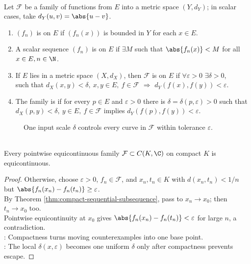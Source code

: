 \begin{definition} \label{def:pointwise-uniform-bounded-equicontinuous} \\
Let $\mathcal{F}$ be a family of functions from $E$ into a metric space $(Y,d_Y)$; in scalar cases, take $d_Y(u,v)=\abs{u-v}$.
\begin{enumerate}[label=(\roman*)]
\setlength{\itemsep}{0pt}
\item $(f_n)$ is  on $E$ if $(f_n(x))$ is bounded in $Y$ for each $x\in E$.
\item A scalar sequence $(f_n)$ is  on $E$ if $\exists M$ such that $\abs{f_n(x)}<M$ for all $x\in E,n\in\N$.
\item If $E$ lies in a metric space $(X,d_X)$, then $\mathcal{F}$ is  on $E$ if $\forall\varepsilon>0$ $\exists\delta>0$,\\
such that $d_X(x,y)<\delta,\ x,y\in E,\ f\in\mathcal{F}$ $\Longrightarrow$ $d_Y(f(x),f(y))<\varepsilon$.
\item The family is  if for every $p\in E$ and $\varepsilon>0$ there is $\delta=\delta(p,\varepsilon)>0$ such that $d_X(p,y)<\delta,\ y\in E,\ f\in\mathcal{F}$ implies $d_Y(f(p),f(y))<\varepsilon$.
\end{enumerate}
\end{definition}

\begin{figure}[H]
  \centering
  
  \caption{One input scale $\delta$ controls every curve in $\mathcal F$ within tolerance $\varepsilon$.}
  \label{fig:equicontinuity-family-schematic}
\end{figure}

\begin{theorem} \label{thm:pointwise-equicontinuity-compact-uniform} \\
Every pointwise equicontinuous family $\mathcal{F}\subset C(K,\C)$ on compact $K$ is equicontinuous.
\begin{proof}
Otherwise, choose $\varepsilon>0$, $f_n\in\mathcal{F}$, and $x_n,t_n\in K$ with $d(x_n,t_n)<1/n$ but $\abs{f_n(x_n)-f_n(t_n)}\geq\varepsilon$.\\
By Theorem \ref{thm:compact-sequential-subsequence}, pass to $x_n\to x_0$; then $t_n\to x_0$ too.\\
Pointwise equicontinuity at $x_0$ gives $\abs{f_n(x_n)-f_n(t_n)}<\varepsilon$ for large $n$, a contradiction.\\
: Compactness turns moving counterexamples into one base point.\\
: The local $\delta(x,\varepsilon)$ becomes one uniform $\delta$ only after compactness prevents escape.
\end{proof}
\end{theorem}

